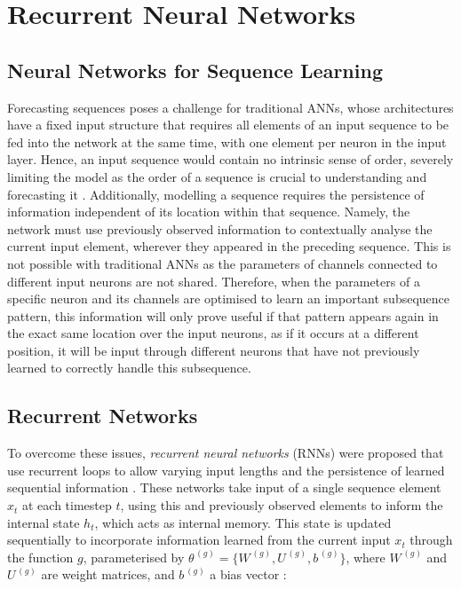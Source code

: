\documentclass[a4paper, 11pt]{report}
\begin{document}
    \section{Recurrent Neural Networks}

    \subsection{Neural Networks for Sequence Learning}

    Forecasting sequences poses a challenge for traditional ANNs, whose architectures have a fixed input structure that requires all elements of an input sequence to be fed into the network at the same time, with one element per neuron in the input layer. Hence, an input sequence would contain no intrinsic sense of order, severely limiting the model as the order of a sequence is crucial to understanding and forecasting it \citep{tsantekidis-2022}. Additionally, modelling a sequence requires the persistence of information independent of its location within that sequence. Namely, the network must use previously observed information to contextually analyse the current input element, wherever they appeared in the preceding sequence. This is not possible with traditional ANNs as the parameters of channels connected to different input neurons are not shared. Therefore, when the parameters of a specific neuron and its channels are optimised to learn an important subsequence pattern, this information will only prove useful if that pattern appears again in the exact same location over the input neurons, as if it occurs at a different position, it will be input through different neurons that have not previously learned to correctly handle this subsequence.


    \subsection{Recurrent Networks}

    To overcome these issues, \emph{recurrent neural networks} (RNNs) were proposed that use recurrent loops to allow varying input lengths and the persistence of learned sequential information \citep{sharma-2022}. These networks take input of a single sequence element $x_t$ at each timestep $t$, using this and previously observed elements to inform the internal state $h_t$, which acts as internal memory. This state is updated sequentially to incorporate information learned from the current input $x_t$ through the function $g$, parameterised by $\theta^{\,(g)} = \big\{ W^{\,(g)}, U^{\,(g)}, b^{\,(g)} \big\}$, where $W^{\,(g)}$ and $U^{\,(g)}$ are weight matrices, and $b^{\,(g)}$ a bias vector \citep{sharma-2022}:
\end{document}
